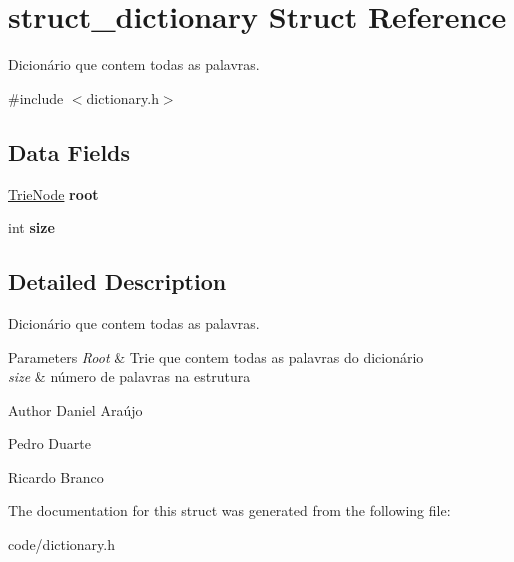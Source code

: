 \hypertarget{structstruct__dictionary}{\section{struct\+\_\+dictionary Struct Reference}
\label{structstruct__dictionary}
}


Dicionário que contem todas as palavras.  




{\ttfamily \#include $<$dictionary.\+h$>$}

\subsection*{Data Fields}
\begin{DoxyCompactItemize}
\item 
\hypertarget{structstruct__dictionary_a06c8b67fb49a1a231098e945e62cc30b}{\hyperlink{structtrie__node}{Trie\+Node} {\bfseries root}}\label{structstruct__dictionary_a06c8b67fb49a1a231098e945e62cc30b}

\item 
\hypertarget{structstruct__dictionary_a439227feff9d7f55384e8780cfc2eb82}{int {\bfseries size}}\label{structstruct__dictionary_a439227feff9d7f55384e8780cfc2eb82}

\end{DoxyCompactItemize}


\subsection{Detailed Description}
Dicionário que contem todas as palavras. 


\begin{DoxyParams}{Parameters}
{\em Root} & Trie que contem todas as palavras do dicionário \\
\hline
{\em size} & número de palavras na estrutura \\
\hline
\end{DoxyParams}
\begin{DoxyAuthor}{Author}
Daniel Araújo 

Pedro Duarte 

Ricardo Branco 
\end{DoxyAuthor}


The documentation for this struct was generated from the following file\+:\begin{DoxyCompactItemize}
\item 
code/dictionary.\+h\end{DoxyCompactItemize}
